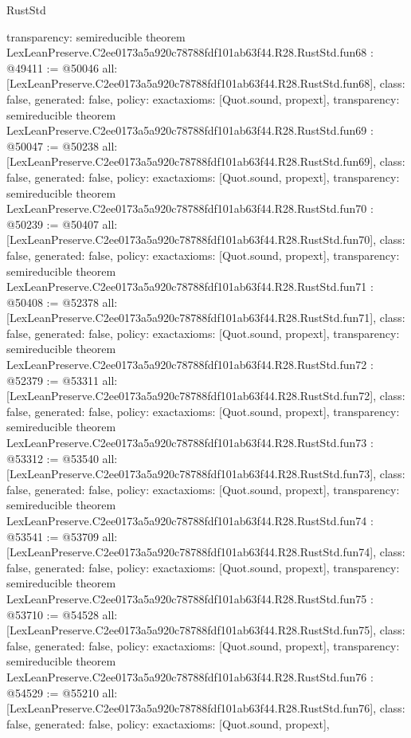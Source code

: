 \begin{lexlean}{RustStd}
\begin{coremodule}
{  transparency: semireducible
}
theorem LexLeanPreserve.C2ee0173a5a920c78788fdf101ab63f44.R28.RustStd.fun68 : @49411 := @50046 {
  all: [LexLeanPreserve.C2ee0173a5a920c78788fdf101ab63f44.R28.RustStd.fun68],
  class: false,
  generated: false,
  policy: exact{axioms: [Quot.sound, propext]},
  transparency: semireducible
}
theorem LexLeanPreserve.C2ee0173a5a920c78788fdf101ab63f44.R28.RustStd.fun69 : @50047 := @50238 {
  all: [LexLeanPreserve.C2ee0173a5a920c78788fdf101ab63f44.R28.RustStd.fun69],
  class: false,
  generated: false,
  policy: exact{axioms: [Quot.sound, propext]},
  transparency: semireducible
}
theorem LexLeanPreserve.C2ee0173a5a920c78788fdf101ab63f44.R28.RustStd.fun70 : @50239 := @50407 {
  all: [LexLeanPreserve.C2ee0173a5a920c78788fdf101ab63f44.R28.RustStd.fun70],
  class: false,
  generated: false,
  policy: exact{axioms: [Quot.sound, propext]},
  transparency: semireducible
}
theorem LexLeanPreserve.C2ee0173a5a920c78788fdf101ab63f44.R28.RustStd.fun71 : @50408 := @52378 {
  all: [LexLeanPreserve.C2ee0173a5a920c78788fdf101ab63f44.R28.RustStd.fun71],
  class: false,
  generated: false,
  policy: exact{axioms: [Quot.sound, propext]},
  transparency: semireducible
}
theorem LexLeanPreserve.C2ee0173a5a920c78788fdf101ab63f44.R28.RustStd.fun72 : @52379 := @53311 {
  all: [LexLeanPreserve.C2ee0173a5a920c78788fdf101ab63f44.R28.RustStd.fun72],
  class: false,
  generated: false,
  policy: exact{axioms: [Quot.sound, propext]},
  transparency: semireducible
}
theorem LexLeanPreserve.C2ee0173a5a920c78788fdf101ab63f44.R28.RustStd.fun73 : @53312 := @53540 {
  all: [LexLeanPreserve.C2ee0173a5a920c78788fdf101ab63f44.R28.RustStd.fun73],
  class: false,
  generated: false,
  policy: exact{axioms: [Quot.sound, propext]},
  transparency: semireducible
}
theorem LexLeanPreserve.C2ee0173a5a920c78788fdf101ab63f44.R28.RustStd.fun74 : @53541 := @53709 {
  all: [LexLeanPreserve.C2ee0173a5a920c78788fdf101ab63f44.R28.RustStd.fun74],
  class: false,
  generated: false,
  policy: exact{axioms: [Quot.sound, propext]},
  transparency: semireducible
}
theorem LexLeanPreserve.C2ee0173a5a920c78788fdf101ab63f44.R28.RustStd.fun75 : @53710 := @54528 {
  all: [LexLeanPreserve.C2ee0173a5a920c78788fdf101ab63f44.R28.RustStd.fun75],
  class: false,
  generated: false,
  policy: exact{axioms: [Quot.sound, propext]},
  transparency: semireducible
}
theorem LexLeanPreserve.C2ee0173a5a920c78788fdf101ab63f44.R28.RustStd.fun76 : @54529 := @55210 {
  all: [LexLeanPreserve.C2ee0173a5a920c78788fdf101ab63f44.R28.RustStd.fun76],
  class: false,
  generated: false,
  policy: exact{axioms: [Quot.sound, propext]},
}
\end{coremodule}
\end{lexlean}
